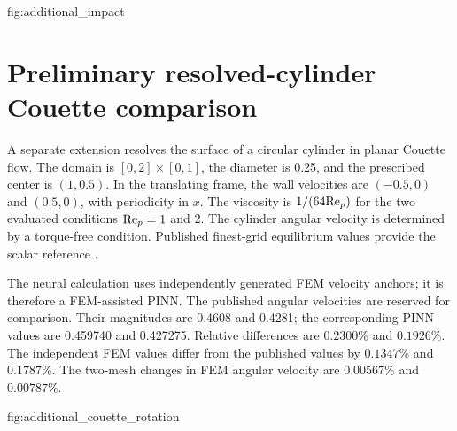{fig:additional_impact}
\FloatBarrier

\section{Preliminary resolved-cylinder Couette comparison}
A separate extension resolves the surface of a circular cylinder in
planar Couette flow. The domain is $[0,2]\times[0,1]$, the diameter is
0.25, and the prescribed center is $(1,0.5)$. In the translating frame,
the wall velocities are $(-0.5,0)$ and $(0.5,0)$, with periodicity in $x$.
The viscosity is $1/(64\mathrm{Re}_p)$ for the two evaluated conditions
$\mathrm{Re}_p=1$ and 2. The cylinder angular velocity is determined by a
torque-free condition. Published finest-grid equilibrium values provide
the scalar reference \citep{garcia2023}.

The neural calculation uses independently generated FEM velocity anchors;
it is therefore a FEM-assisted PINN. The published angular velocities
are reserved for comparison. Their magnitudes are 0.4608 and 0.4281;
the corresponding PINN values are 0.459740 and 0.427275. Relative
differences are $0.2300\%$ and $0.1926\%$. The independent FEM values
differ from the published values by $0.1347\%$ and $0.1787\%$.
The two-mesh changes in FEM angular velocity are $0.00567\%$ and
$0.00787\%$.

{fig:additional_couette_rotation}
\FloatBarrier

